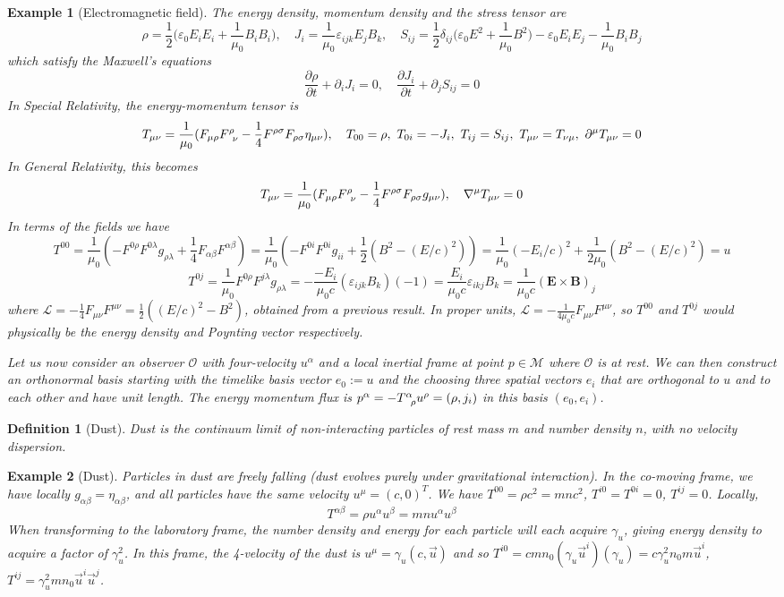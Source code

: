 \documentclass[a4paper]{article}
\newtheorem{eg}{Example}[section]
\theoremstyle{new}
\newtheorem{defi}{Definition}[section]
\begin{document}
\begin{eg}[Electromagnetic field]
The energy density, momentum density and the stress tensor are $$\rho=\frac{1}{2}\bigg(\varepsilon_0E_iE_i+\frac{1}{\mu_0}B_iB_i\bigg),\quad J_i=\frac{1}{\mu_0}\varepsilon_{ijk}E_jB_k,\quad S_{ij}=\frac{1}{2}\delta_{ij}\bigg(\varepsilon_0E^2+\frac{1}{\mu_0}B^2\bigg)-\varepsilon_0E_iE_j-\frac{1}{\mu_0}B_iB_j$$
which satisfy the Maxwell's equations
$$\frac{\partial\rho}{\partial t}+\partial_iJ_i=0,\quad\frac{\partial J_i}{\partial t}+\partial_jS_{ij}=0$$
In Special Relativity, the energy-momentum tensor is
$$T_{\mu\nu}=\frac{1}{\mu_0}(F_{\mu\rho}\tensor*{F}{*_{}^{\rho}_{\nu}}-\frac{1}{4}F^{\rho\sigma}F_{\rho\sigma}\eta_{\mu\nu}),\quad T_{00}=\rho,~T_{0i}=-J_i,~T_{ij}=S_{ij},~T_{\mu\nu}=T_{\nu\mu},~\partial^\mu T_{\mu\nu}=0$$
In General Relativity, this becomes
$$T_{\mu\nu}=\frac{1}{\mu_0}(F_{\mu\rho}\tensor*{F}{*_{}^{\rho}_{\nu}}-\frac{1}{4}F^{\rho\sigma}F_{\rho\sigma}g_{\mu\nu}),\quad\nabla^\mu T_{\mu\nu}=0$$
In terms of the fields we have
$$T^{00}=\frac{1}{\mu_0}(-F^{0\rho}F^{0\lambda}g_{\rho\lambda}+\frac{1}{4}F_{\alpha\beta}F^{\alpha\beta})=\frac{1}{\mu_0}(-F^{0i}F^{0i}g_{ii}+\frac{1}{2}(B^2-(E/c)^2))=\frac{1}{\mu_0}(-E_i/c)^2+\frac{1}{2\mu_0}(B^2-(E/c)^2)=u$$
$$T^{0j}=\frac{1}{\mu_0}F^{0\rho}F^{j\lambda}g_{\rho\lambda}=-\frac{-E_i}{\mu_0c}(\varepsilon_{ijk}B_k)(-1)=\frac{E_i}{\mu_0c}\varepsilon_{ikj}B_k=\frac{1}{\mu_0c}(\mathbf{E}\times\mathbf{B})_j$$
where $\mathcal{L}=-\frac{1}{4}F_{\mu\nu}F^{\mu\nu}=\frac{1}{2}((E/c)^2-B^2)$, obtained from a previous result. In proper units, $\mathcal{L}=-\frac{1}{4\mu_0c}F_{\mu\nu}F^{\mu\nu}$, so $T^{00}$ and $T^{0j}$ would physically be the energy density and Poynting vector respectively.

Let us now consider an observer $\mathcal{O}$ with four-velocity $u^\alpha$ and a local inertial frame at point $p\in\mathcal{M}$ where $\mathcal{O}$ is at rest. We can then construct an orthonormal basis starting with the timelike basis vector $e_0 :=u$ and the choosing three spatial vectors $e_i$ that are orthogonal to $u$ and to each other and have unit length. The energy momentum flux is $p^\alpha=-\tensor*{T}{*_{}^{\alpha}_{\rho}}u^\rho=(\rho,j_i)$ in this basis $(e_0,e_i)$.
\end{eg}
\begin{defi}[Dust]
Dust is the continuum limit of non-interacting particles of rest mass $m$ and number density $n$, with no velocity dispersion.
\end{defi}
\begin{eg}[Dust] Particles in dust are freely falling (dust evolves purely under gravitational interaction). In the co-moving frame, we have locally $g_{\alpha\beta}=\eta_{\alpha\beta}$, and all particles have the same velocity $u^\mu=(c,0)^T$. We have $T^{00}=\rho c^2=mnc^2$, $T^{i0}=T^{0i}=0$, $T^{ij}=0$. Locally,
$$T^{\alpha\beta}=\rho u^\alpha u^\beta=mn u^\alpha u^\beta$$
When transforming to the laboratory frame, the number density and energy for each particle will each acquire $\gamma_u$, giving energy density to acquire a factor of $\gamma_u^2$. In this frame, the 4-velocity of the dust is $u^\mu=\gamma_u(c,\vec{u})$ and so $T^{i0}=cmn_0(\gamma_u\vec{u}^i)(\gamma_u)=c\gamma_u^2n_0m\vec{u}^i$, $T^{ij}=\gamma_u^2mn_0\vec{u}^i\vec{u}^j$.
\end{eg}
\end{document}
